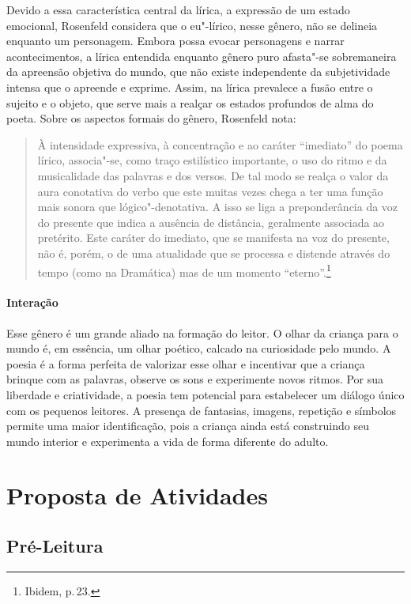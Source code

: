\documentclass[11pt]{extarticle}
\begin{document}
Devido a essa característica central da lírica, a expressão de um estado emocional, Rosenfeld considera que o eu"-lírico, nesse gênero, não se delineia enquanto um personagem. Embora possa evocar personagens e narrar acontecimentos, a lírica entendida enquanto gênero puro afasta"-se sobremaneira da apreensão objetiva do mundo, que não existe independente da subjetividade intensa que o apreende e exprime. Assim, na lírica prevalece a fusão entre o sujeito e o objeto, que serve mais a realçar os estados profundos de alma do poeta.
Sobre os aspectos formais do gênero, Rosenfeld nota:

\begin{quote}
À intensidade expressiva, à concentração e ao caráter ``imediato'' do poema lírico, associa"-se, como traço estilístico importante, o uso do ritmo e da musicalidade das palavras e dos versos. De tal modo se realça o valor da aura conotativa do verbo que este muitas vezes chega a ter uma função mais sonora que lógico"-denotativa. A isso se liga a preponderância da voz do presente que indica a ausência de distância, geralmente associada ao pretérito. Este caráter do imediato, que se manifesta na voz do presente, não é, porém, o de uma atualidade que se processa e distende através do tempo (como na Dramática) mas de um momento ``eterno''.\footnote{Ibidem, p.\,23.}
\end{quote}

\paragraph{Interação} Esse gênero é um grande aliado na formação do leitor. O olhar da criança para o mundo é, em essência, um olhar poético, calcado na curiosidade pelo mundo. A poesia é a forma perfeita de valorizar esse olhar e incentivar que a criança brinque com as palavras, observe os sons e experimente novos ritmos. Por sua liberdade e criatividade, a poesia tem potencial para estabelecer um diálogo único com os pequenos leitores. A presença de fantasias, imagens, repetição e símbolos permite uma maior identificação, pois a criança ainda está construindo seu mundo interior e experimenta a vida de forma diferente do adulto. 

\section{Proposta de Atividades}
\subsection{Pré-Leitura}
\end{document}

